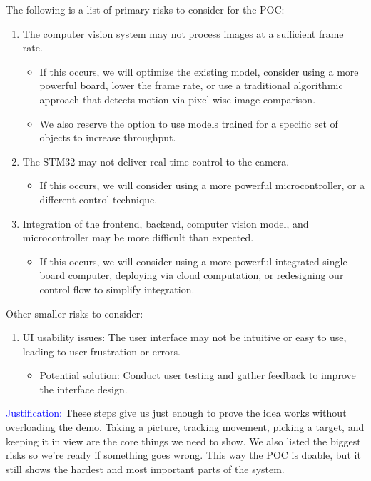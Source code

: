 \documentclass{article}
\begin{document}
The following is a list of primary risks to consider for the POC:
\begin{enumerate}
  \item The computer vision system may not process images at a sufficient frame rate.
        \begin{itemize}
          \item If this occurs, we will optimize the existing model, consider using a more
                powerful board, lower the frame rate, or use a traditional algorithmic approach
                that detects motion via pixel-wise image comparison.
          \item We also reserve the option to use models trained for a specific set of objects
                to increase throughput.
        \end{itemize}
  \item The STM32 may not deliver real-time control to the camera.
        \begin{itemize}
          \item If this occurs, we will consider using a more powerful microcontroller, or a
                different control technique.
        \end{itemize}
  \item Integration of the frontend, backend, computer vision model, and
        microcontroller may be more difficult than expected.
        \begin{itemize}
          \item If this occurs, we will consider using a more powerful integrated single-board
                computer, deploying via cloud computation, or redesigning our control flow to
                simplify integration.
        \end{itemize}
\end{enumerate}

Other smaller risks to consider:
\begin{enumerate}
  \item UI usability issues: The user interface may not be intuitive or easy to use,
        leading to user frustration or errors.
        \begin{itemize}
          \item {Potential solution}: Conduct user testing and gather feedback to improve the interface design.
        \end{itemize}
\end{enumerate}

\textcolor{blue}{Justification:} These steps give us just enough to prove the idea works
without overloading the demo. Taking a picture, tracking movement, picking a target,
and keeping it in view are the core things we need to show. We also listed the biggest
risks so we’re ready if something goes wrong. This way the POC is doable, but it still
shows the hardest and most important parts of the system.
\end{document}
